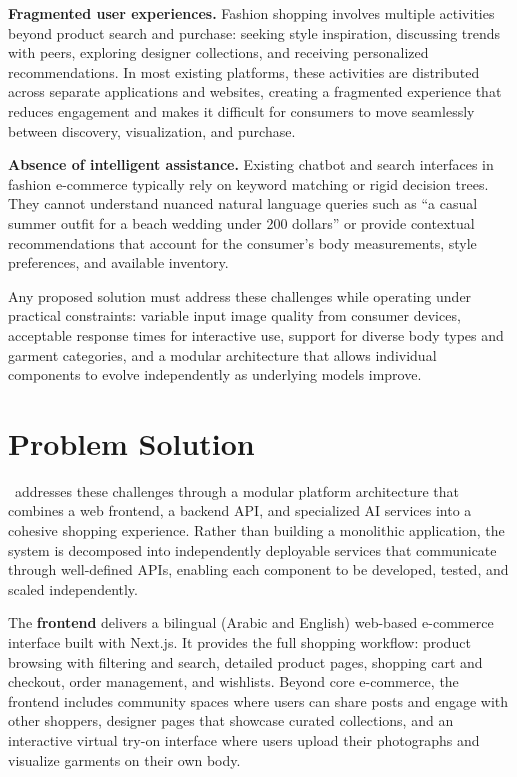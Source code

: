 \textbf{Fragmented user experiences.} Fashion shopping involves multiple activities beyond product search and purchase: seeking style inspiration, discussing trends with peers, exploring designer collections, and receiving personalized recommendations. In most existing platforms, these activities are distributed across separate applications and websites, creating a fragmented experience that reduces engagement and makes it difficult for consumers to move seamlessly between discovery, visualization, and purchase.

\textbf{Absence of intelligent assistance.} Existing chatbot and search interfaces in fashion e-commerce typically rely on keyword matching or rigid decision trees. They cannot understand nuanced natural language queries such as ``a casual summer outfit for a beach wedding under 200 dollars'' or provide contextual recommendations that account for the consumer's body measurements, style preferences, and available inventory.

Any proposed solution must address these challenges while operating under practical constraints: variable input image quality from consumer devices, acceptable response times for interactive use, support for diverse body types and garment categories, and a modular architecture that allows individual components to evolve independently as underlying models improve.

\section{Problem Solution}
\projectname\ addresses these challenges through a modular platform architecture that combines a web frontend, a backend API, and specialized AI services into a cohesive shopping experience. Rather than building a monolithic application, the system is decomposed into independently deployable services that communicate through well-defined APIs, enabling each component to be developed, tested, and scaled independently.

The \textbf{frontend} delivers a bilingual (Arabic and English) web-based e-commerce interface built with Next.js. It provides the full shopping workflow: product browsing with filtering and search, detailed product pages, shopping cart and checkout, order management, and wishlists. Beyond core e-commerce, the frontend includes community spaces where users can share posts and engage with other shoppers, designer pages that showcase curated collections, and an interactive virtual try-on interface where users upload their photographs and visualize garments on their own body.

